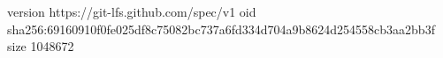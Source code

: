 version https://git-lfs.github.com/spec/v1
oid sha256:69160910f0fe025df8c75082bc737a6fd334d704a9b8624d254558cb3aa2bb3f
size 1048672
